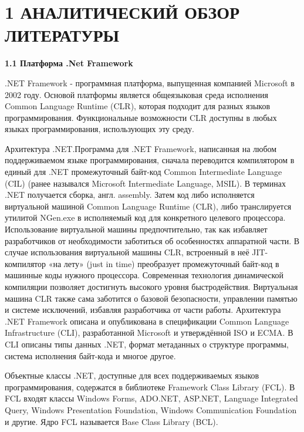\documentclass[14pt,a4paper]{extreport}
\begin{document}
	\newpage
	\section*{\normalsize\hspace{4ex}1 АНАЛИТИЧЕСКИЙ ОБЗОР ЛИТЕРАТУРЫ}
	\textbf{1.1  Платформа .Net Framework}

	\parindent=1cm .NET Framework  - программная платформа, выпущенная компанией Microsoft в 2002 году. Основой платформы является общеязыковая среда исполнения Common Language Runtime (CLR), которая подходит для разных языков программирования. Функциональные возможности CLR доступны в любых языках программирования, использующих эту среду.\par
	Архитектура .NET.Программа для .NET Framework, написанная на любом поддерживаемом языке программирования, сначала переводится компилятором в единый для .NET промежуточный байт-код Common Intermediate Language (CIL) (ранее назывался Microsoft Intermediate Language, MSIL). В терминах .NET получается сборка, англ. assembly. Затем код либо исполняется виртуальной машиной Common Language Runtime (CLR), либо транслируется утилитой NGen.exe в исполняемый код для конкретного целевого процессора. Использование виртуальной машины предпочтительно, так как избавляет разработчиков от необходимости заботиться об особенностях аппаратной части. В случае использования виртуальной машины CLR, встроенный в неё JIT-компилятор «на лету» (just in time) преобразует промежуточный байт-код в машинные коды нужного процессора. Современная технология динамической компиляции позволяет достигнуть высокого уровня быстродействия. Виртуальная машина CLR также сама заботится о базовой безопасности, управлении памятью и системе исключений, избавляя разработчика от части работы. Архитектура .NET Framework описана и опубликована в спецификации Common Language Infrastructure (CLI), разработанной Microsoft и утверждённой ISO и ECMA. В CLI описаны типы данных .NET, формат метаданных о структуре программы, система исполнения байт-кода и многое другое.\par
	Объектные классы .NET, доступные для всех поддерживаемых языков программирования, содержатся в библиотеке Framework Class Library (FCL). В FCL входят классы Windows Forms, ADO.NET, ASP.NET, Language Integrated Query, Windows Presentation Foundation, Windows Communication Foundation и другие. Ядро FCL называется Base Class Library (BCL).
\end{document}
